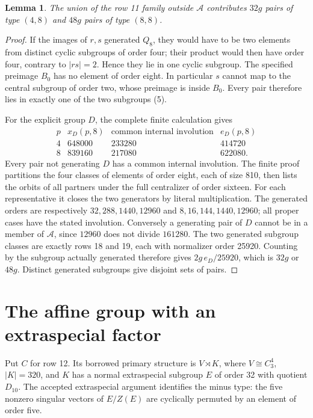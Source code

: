 \documentclass[11pt,a4paper]{article}
\newtheorem{lemma}{Lemma}\newtheorem{theorem}{Theorem}
\begin{document}
\begin{lemma}\label{Bcount}
The union of the row 11 family outside $\mathcal A$ contributes
$32g$ pairs of type $(4,8)$ and $48g$ pairs of type $(8,8)$.
\end{lemma}
\begin{proof}
If the images of $r,s$ generated $Q_8$, they would have to be two
elements from distinct cyclic subgroups of order four; their product
would then have order four, contrary to $|rs|=2$. Hence they lie in
one cyclic subgroup. The specified preimage $B_0$ has no element of
order eight. In particular $s$ cannot map to the central subgroup of
order two, whose preimage is inside $B_0$. Every pair therefore lies
in exactly one of the two subgroups (5).

For the explicit group $D$, the complete finite calculation gives
\[
\begin{array}{c|rrr}
p&x_D(p,8)&\text{common internal involution}&e_D(p,8)\\\hline
4&648000&233280&414720\\
8&839160&217080&622080.
\end{array}                                                \tag{6}
\]
Every pair not generating $D$ has a common internal involution.
The finite proof partitions the four classes of elements of order
eight, each of size 810, then lists the orbits of all partners under
the full centralizer of order sixteen. For each representative it
closes the two generators by literal multiplication. The generated
orders are respectively $32,288,1440,12960$ and
$8,16,144,1440,12960$; all proper cases have the stated involution.
Conversely a generating pair of $D$ cannot be in a member of
$\mathcal A$, since $12960$ does not divide $161280$.
The two generated subgroup classes are exactly rows 18 and 19,
each with normalizer order 25920. Counting by the subgroup actually
generated therefore gives $2g\,e_D/25920$, which is $32g$ or $48g$.
Distinct generated subgroups give disjoint sets of pairs.
\end{proof}

\section*{The affine group with an extraspecial factor}
Put $C$ for row 12. Its borrowed primary structure is $V\rtimes K$,
where $V\cong C_3^4$, $|K|=320$, and $K$ has a normal extraspecial
subgroup $E$ of order 32 with quotient $D_{10}$. The accepted
extraspecial argument identifies the minus type: the five nonzero
singular vectors of $E/Z(E)$ are cyclically permuted by an element
of order five.
\end{document}
